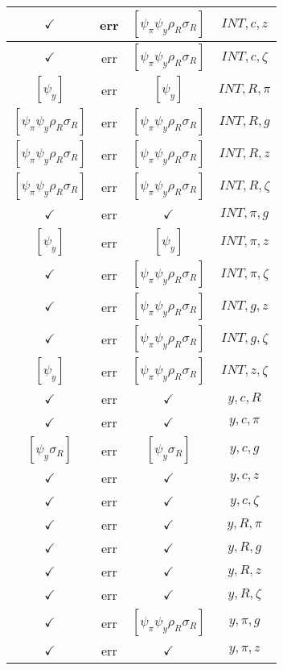 \documentclass[a4paper,10pt]{article}
\begin{document}
\begin{longtable}{|c|c|c|c|}
\hline
$\checkmark$ & err & $[\psi_\pi \psi_y \rho_R \sigma_R ]$ & ${INT},{c},{z}$ \\
\hline
$\checkmark$ & err & $[\psi_\pi \psi_y \rho_R \sigma_R ]$ & ${INT},{c},{\zeta}$ \\
\hline
$[\psi_y ]$ & err & $[\psi_y ]$ & ${INT},{R},{\pi}$ \\
\hline
$[\psi_\pi \psi_y \rho_R \sigma_R ]$ & err & $[\psi_\pi \psi_y \rho_R \sigma_R ]$ & ${INT},{R},{g}$ \\
\hline
$[\psi_\pi \psi_y \rho_R \sigma_R ]$ & err & $[\psi_\pi \psi_y \rho_R \sigma_R ]$ & ${INT},{R},{z}$ \\
\hline
$[\psi_\pi \psi_y \rho_R \sigma_R ]$ & err & $[\psi_\pi \psi_y \rho_R \sigma_R ]$ & ${INT},{R},{\zeta}$ \\
\hline
$\checkmark$ & err & $\checkmark$ & ${INT},{\pi},{g}$ \\
\hline
$[\psi_y ]$ & err & $[\psi_y ]$ & ${INT},{\pi},{z}$ \\
\hline
$\checkmark$ & err & $[\psi_\pi \psi_y \rho_R \sigma_R ]$ & ${INT},{\pi},{\zeta}$ \\
\hline
$\checkmark$ & err & $[\psi_\pi \psi_y \rho_R \sigma_R ]$ & ${INT},{g},{z}$ \\
\hline
$\checkmark$ & err & $[\psi_\pi \psi_y \rho_R \sigma_R ]$ & ${INT},{g},{\zeta}$ \\
\hline
$[\psi_y ]$ & err & $[\psi_\pi \psi_y \rho_R \sigma_R ]$ & ${INT},{z},{\zeta}$ \\
\hline
$\checkmark$ & err & $\checkmark$ & ${y},{c},{R}$ \\
\hline
$\checkmark$ & err & $\checkmark$ & ${y},{c},{\pi}$ \\
\hline
$[\psi_y \sigma_R ]$ & err & $[\psi_y \sigma_R ]$ & ${y},{c},{g}$ \\
\hline
$\checkmark$ & err & $\checkmark$ & ${y},{c},{z}$ \\
\hline
$\checkmark$ & err & $\checkmark$ & ${y},{c},{\zeta}$ \\
\hline
$\checkmark$ & err & $\checkmark$ & ${y},{R},{\pi}$ \\
\hline
$\checkmark$ & err & $\checkmark$ & ${y},{R},{g}$ \\
\hline
$\checkmark$ & err & $\checkmark$ & ${y},{R},{z}$ \\
\hline
$\checkmark$ & err & $\checkmark$ & ${y},{R},{\zeta}$ \\
\hline
$\checkmark$ & err & $[\psi_\pi \psi_y \rho_R \sigma_R ]$ & ${y},{\pi},{g}$ \\
\hline
$\checkmark$ & err & $\checkmark$ & ${y},{\pi},{z}$ \\

\end{longtable}
\end{document}
